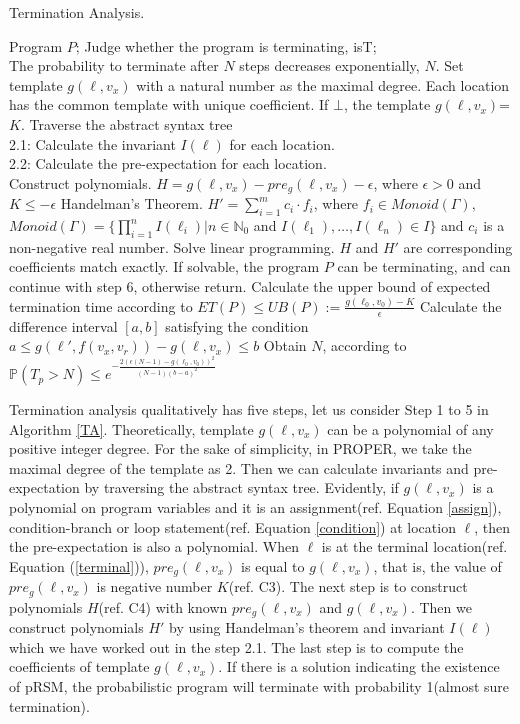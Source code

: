 \documentclass[conference]{IEEEtran}
\begin{document}
\begin{algorithm}[htb]  
	\caption{Termination Analysis.}  
	\label{TA}  
	\begin{algorithmic}[1]  
		\REQUIRE 
		Program $P$; 
		\ENSURE  
		Judge whether the program is terminating, isT;\\
		The probability to terminate after $N$ steps decreases exponentially, $N$.
		\STATE Set template $g(\ell,v_x)$ with a natural number as the maximal degree. Each location has the common template with unique coefficient. If $\bot$, the template $g(\ell,v_x)$=$K$.
		\STATE Traverse the abstract syntax tree \\
		2.1: Calculate the invariant $I(\ell)$ for each location.\\
		2.2: Calculate the pre-expectation for each location.\\
		\STATE  Construct polynomials. $H=g(\ell,v_x)-pre_g(\ell,v_x)-\epsilon$, where $\epsilon >0$ and $K \leq -\epsilon$
		\STATE Handelman's Theorem. $H'=\sum\limits_{i=1}^{m} c_i \cdot f_i$, where $f_i \in Monoid(\Gamma)$, $Monoid(\Gamma)=\{\prod\limits_{i=1}^{n} I(\ell_i) | n\in\mathbb{N}_0$ and $ I(\ell_1),\dots,I(\ell_n) \in I\}$ and $c_i$ is a non-negative real number.
		\STATE Solve linear programming. $H$ and $H'$ are corresponding coefficients match exactly. If solvable, the program $P$ can be terminating, and can continue with step 6, otherwise return.
		\STATE Calculate the upper bound of expected termination time according to $ET(P)\leq UB(P):=\frac{g(\ell_0,v_0)-K}{\epsilon}$
		\STATE Calculate the difference interval $[a,b]$ satisfying the condition $a\leq g(\ell',f(v_x,v_r))-g(\ell,v_x)\leq b$
		\STATE Obtain $N$, according to $\mathbb{P}(T_p > N) \leq e^{-\frac{2(\epsilon(N-1)-g(\ell_0,v_0))^2}{(N-1)(b-a)^2}}$
	\end{algorithmic}  
\end{algorithm} 

Termination analysis qualitatively has five steps, let us consider Step 1 to 5 in Algorithm \ref{TA}. Theoretically, template $g(\ell,v_x)$ can be a polynomial of any positive integer  degree. For the sake of simplicity, in PROPER, we take the maximal degree of the template as 2. 
Then we can calculate invariants and pre-expectation by traversing the abstract syntax tree. Evidently, if $g(\ell,v_x)$ is a polynomial on program variables and it is an assignment(ref. Equation \eqref{assign}), condition-branch or loop statement(ref. Equation \eqref{condition}) at location $\ell$, then the pre-expectation is also a polynomial. 
When $\ell$ is at the terminal location(ref. Equation (\ref{terminal})),  $pre_g(\ell,v_x)$ is equal to $g(\ell,v_x)$, that is, the value of $pre_g(\ell,v_x)$ is negative number $K$(ref. C3).
The next step is to construct polynomials $H$(ref. C4) with known $pre_g(\ell,v_x)$ and $g(\ell,v_x)$. Then we construct polynomials $H'$ by using Handelman's theorem and invariant $I(\ell)$ which we have worked out in the step 2.1.
The last step is to compute  the coefficients of template $g(\ell,v_x)$. If there is a solution indicating the existence of pRSM, the probabilistic program will terminate with probability 1(almost sure termination).
\end{document}
